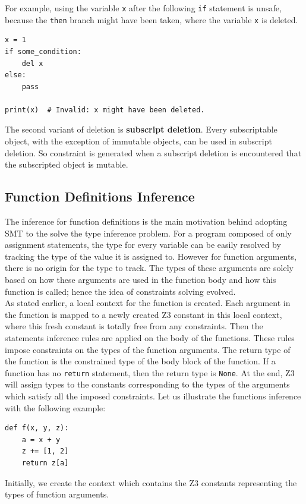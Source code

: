For example, using the variable \lstinline|x| after the following \lstinline|if| statement is unsafe, because the \lstinline|then| branch might have been taken, where the variable \lstinline|x| is deleted.
\begin{lstlisting}
x = 1
if some_condition:
	del x
else:
	pass
	
print(x)  # Invalid: x might have been deleted.
\end{lstlisting}

The second variant of deletion is \textbf{subscript deletion}. Every subscriptable object, with the exception of immutable objects, can be used in subscript deletion. So constraint is generated when a subscript deletion is encountered that the subscripted object is mutable.
\subsection{Function Definitions Inference}\label{func}
The inference for function definitions is the main motivation behind adopting SMT to the solve the type inference problem. For a program composed of only assignment statements, the type for every variable can be easily resolved by tracking the type of the value it is assigned to. However for function arguments, there is no origin for the type to track. The types of these arguments are solely based on how these arguments are used in the function body and how this function is called; hence the idea of constraints solving evolved.\\

As stated earlier, a local context for the function is created. Each argument in the function is mapped to a newly created Z3 constant in this local context, where this fresh constant is totally free from any constraints. Then the statements inference rules are applied on the body of the functions. These rules impose constraints on the types of the function arguments. The return type of the function is the constrained type of the body block of the function. If a function has no \lstinline|return| statement, then the return type is \lstinline|None|. At the end, Z3 will assign types to the constants corresponding to the types of the arguments which satisfy all the imposed constraints. Let us illustrate the functions inference with the following example:
\begin{lstlisting}
def f(x, y, z):
	a = x + y
	z += [1, 2]
	return z[a]	
\end{lstlisting}
Initially, we create the context which contains the Z3 constants representing the types of function arguments.

